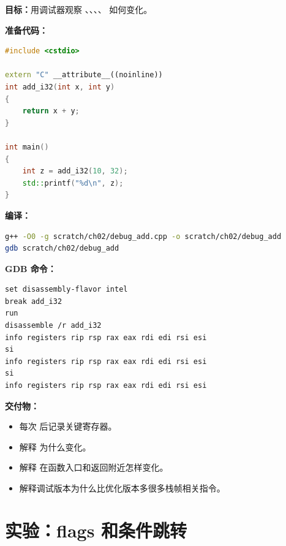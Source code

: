\begin{labbox}
\textbf{目标：}用调试器观察 、、、、 如何变化。

\textbf{准备代码：}

\begin{lstlisting}[language=C++]
#include <cstdio>

extern "C" __attribute__((noinline))
int add_i32(int x, int y)
{
    return x + y;
}

int main()
{
    int z = add_i32(10, 32);
    std::printf("%d\n", z);
}
\end{lstlisting}

\textbf{编译：}

\begin{lstlisting}[language=bash]
g++ -O0 -g scratch/ch02/debug_add.cpp -o scratch/ch02/debug_add
gdb scratch/ch02/debug_add
\end{lstlisting}

\textbf{GDB 命令：}

\begin{lstlisting}
set disassembly-flavor intel
break add_i32
run
disassemble /r add_i32
info registers rip rsp rax eax rdi edi rsi esi
si
info registers rip rsp rax eax rdi edi rsi esi
si
info registers rip rsp rax eax rdi edi rsi esi
\end{lstlisting}

\textbf{交付物：}

\begin{itemize}
  \item 每次  后记录关键寄存器。
  \item 解释  为什么变化。
  \item 解释  在函数入口和返回附近怎样变化。
  \item 解释调试版本为什么比优化版本多很多栈帧相关指令。
\end{itemize}
\end{labbox}

\section{实验：flags 和条件跳转}


